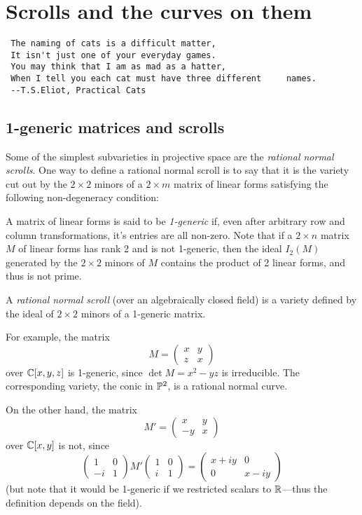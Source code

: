 

\chapter{Scrolls and the curves on them}
\label{ScrollsChapter}


\begin{verbatim}
 The naming of cats is a difficult matter,
 It isn't just one of your everyday games.
 You may think that I am as mad as a hatter,
 When I tell you each cat must have three different 	names.
 --T.S.Eliot, Practical Cats
\end{verbatim}
\section{1-generic matrices and scrolls}
Some of the simplest subvarieties in projective space are the \emph{rational normal scrolls}. One way to define a rational normal scroll is to say that it is the variety cut out by the $2\times 2$ minors of a $2\times m$ matrix of linear forms satisfying the following non-degeneracy condition: 
\begin{definition}
 A matrix of linear forms is said to be \emph{1-generic} if, even after arbitrary row and column transformations, it's entries are all non-zero. Note that if a $2\times n$ matrix
 $M$ of linear forms has rank 2 and is not 1-generic, then the ideal $I_2(M)$ generated by the $2\times 2$ minors of $M$ contains the product of 2 linear forms, and thus is not prime.
\end{definition}

\begin{definition}
A \emph{rational normal scroll} (over an algebraically closed field) is a variety defined by the ideal of $2\times 2$ minors
of a 1-generic matrix. 
\end{definition}
For example, the matrix 
$$
M = \begin{pmatrix}
 x &y\\
 z&x
\end{pmatrix}
$$
over $\CC[x,y,z]$ is  1-generic, since
$\det M = x^2-yz$ is irreducible. The corresponding variety, the conic in $\PP^2$,
is a rational normal curve.

On the other hand, the matrix
$$
M' = \begin{pmatrix}
 x &y\\
 -y&x
\end{pmatrix}
$$
over $\CC[x,y]$ is not, since
$$
\begin{pmatrix}
1&0\\
-i&1 
\end{pmatrix}
M'
\begin{pmatrix}
 1&0\\
 i&1
\end{pmatrix}
= 
\begin{pmatrix}
 x+iy&0\\
 0&x-iy
\end{pmatrix}
$$
(but note that it would be 1-generic if we restricted scalars to $\RR$---thus the definition depends on the field).

